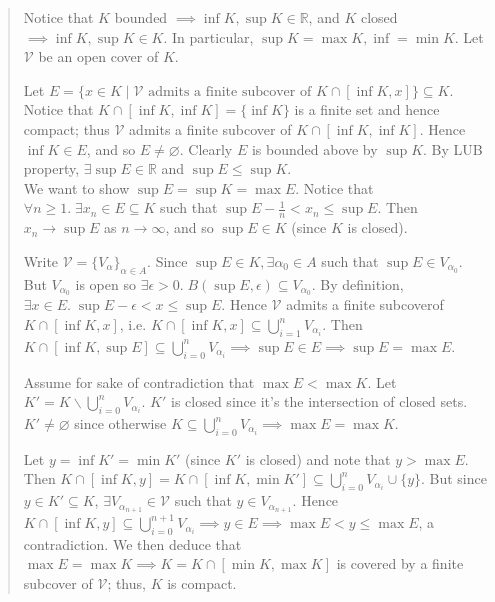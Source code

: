 \documentclass[11pt]{article}
\begin{document}
\begin{quote}\vspace{-0.3cm}
Notice that $K$ bounded $\implies \inf K, \sup K \in \mathbb{R}$, and $K$ closed $\implies \inf K, \sup K \in K$. In particular, $\sup K = \max K, \inf = \min K$. Let $\mathcal{V}$ be an open cover of $K$.

Let $E = \{x \in K \;|\; \mathcal{V} \text{ admits a finite subcover of }K \cap [\inf K, x]\} \subseteq K$. Notice that $K \cap [\inf K, \inf K] = \{\inf K\}$ is a finite set and hence compact; thus $\mathcal{V}$ admits a finite subcover of $K \cap [\inf K, \inf K]$. Hence $\inf K \in E$, and so $E \neq \varnothing$. Clearly $E$ is bounded above by $\sup K$. By LUB property, $\exists \sup E \in \mathbb{R}$ and $\sup E \leq \sup K$.\\

We want to show $\sup E = \sup K = \max E$. Notice that $\forall n \geq 1.\; \exists x_n \in E \subseteq K$ such that $\sup E - \frac{1}{n} < x_n \leq \sup E$. Then $x_n \to \sup E$ as $n \to \infty$, and so $\sup E \in K$ (since $K$ is closed).

Write $\mathcal{V} = \{V_\alpha\}_{\alpha \in A}$. Since $\sup E \in K, \exists \alpha_0 \in A$ such that $\sup E \in V_{\alpha_0}$. But $V_{\alpha_0}$ is open so $\exists \epsilon > 0.\; B(\sup E, \epsilon) \subseteq V_{\alpha_0}$. By definition, $\exists x \in E.\; \sup E - \epsilon < x \leq \sup E$. Hence $\mathcal{V}$ admits a finite subcoverof $K \cap [\inf K, x]$, i.e. $K \cap [\inf K, x] \subseteq \bigcup_{i=1}^n V_{\alpha_i}$. Then $K \cap [\inf K, \sup E] \subseteq \bigcup_{i=0}^n V_{\alpha_i} \implies \sup E \in E \implies \sup E = \max E$.

Assume for sake of contradiction that $\max E < \max K$. Let $K' = K \backslash \bigcup_{i=0}^n V_{\alpha_i}$. $K'$ is closed since it's the intersection of closed sets. $K'\neq \varnothing$ since otherwise $K \subseteq \bigcup_{i=0}^n V_{\alpha_i} \implies \max E = \max K$.

Let $y = \inf K' = \min K'$ (since $K'$ is closed) and note that $y > \max E$. Then $K \cap [\inf K, y] = K \cap [\inf K, \min K'] \subseteq \bigcup_{i=0}^n V_{\alpha_i} \cup \{y\}$. But since $y \in K' \subseteq K$, $\exists V_{\alpha_{n+1}} \in \mathcal{V}$ such that $y \in V_{\alpha_{n+1}}$. Hence $K \cap [\inf K, y] \subseteq \bigcup_{i=0}^{n+1} V_{\alpha_i} \implies y \in E \implies \max E < y \leq \max E$, a contradiction. We then deduce that $\max E = \max K \implies K = K \cap [\min K, \max K]$ is covered by a finite subcover of $\mathcal{V}$; thus, $K$ is compact.
\end{quote}
\end{document}
